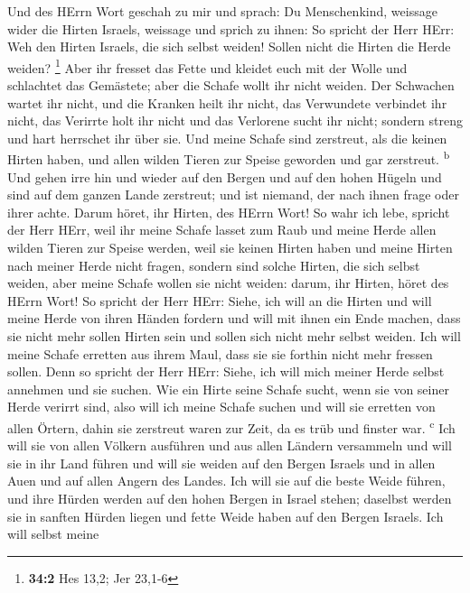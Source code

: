  Und des HErrn Wort geschah zu mir und sprach:
 Du Menschenkind, weissage wider die Hirten Israels,
weissage und sprich zu ihnen: So spricht der Herr HErr: Weh den Hirten
Israels, die sich selbst weiden! Sollen nicht die Hirten die Herde
weiden? \footnote{\textbf{34:2} Hes 13,2; Jer 23,1-6} 
Aber ihr fresset das Fette und kleidet euch mit der Wolle und schlachtet
das Gemästete; aber die Schafe wollt ihr nicht weiden. 
Der Schwachen wartet ihr nicht, und die Kranken heilt ihr nicht, das
Verwundete verbindet ihr nicht, das Verirrte holt ihr nicht und das
Verlorene sucht ihr nicht; sondern streng und hart herrschet ihr über
sie.  Und meine Schafe sind zerstreut, als die keinen
Hirten haben, und allen wilden Tieren zur Speise geworden und gar
zerstreut. \textsuperscript{b}  Und gehen irre hin und
wieder auf den Bergen und auf den hohen Hügeln und sind auf dem ganzen
Lande zerstreut; und ist niemand, der nach ihnen frage oder ihrer achte.
 Darum höret, ihr Hirten, des HErrn Wort! 
So wahr ich lebe, spricht der Herr HErr, weil ihr meine Schafe lasset
zum Raub und meine Herde allen wilden Tieren zur Speise werden, weil sie
keinen Hirten haben und meine Hirten nach meiner Herde nicht fragen,
sondern sind solche Hirten, die sich selbst weiden, aber meine Schafe
wollen sie nicht weiden:  darum, ihr Hirten, höret des
HErrn Wort!  So spricht der Herr HErr: Siehe, ich will an
die Hirten und will meine Herde von ihren Händen fordern und will mit
ihnen ein Ende machen, dass sie nicht mehr sollen Hirten sein und sollen
sich nicht mehr selbst weiden. Ich will meine Schafe erretten aus ihrem
Maul, dass sie sie forthin nicht mehr fressen sollen. 
Denn so spricht der Herr HErr: Siehe, ich will mich meiner Herde selbst
annehmen und sie suchen.  Wie ein Hirte seine Schafe
sucht, wenn sie von seiner Herde verirrt sind, also will ich meine
Schafe suchen und will sie erretten von allen Örtern, dahin sie
zerstreut waren zur Zeit, da es trüb und finster war.
\textsuperscript{c}  Ich will sie von allen Völkern
ausführen und aus allen Ländern versammeln und will sie in ihr Land
führen und will sie weiden auf den Bergen Israels und in allen Auen und
auf allen Angern des Landes.  Ich will sie auf die beste
Weide führen, und ihre Hürden werden auf den hohen Bergen in Israel
stehen; daselbst werden sie in sanften Hürden liegen und fette Weide
haben auf den Bergen Israels.  Ich will selbst meine

